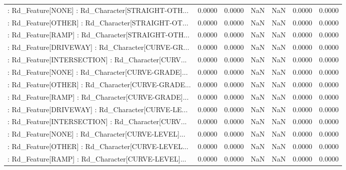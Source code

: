 \begin{longtable}{p{4cm}cccccc}
 : Rd\_Feature[NONE] : Rd\_Character[STRAIGHT-OTH... &            0.0000 &            0.0000 &     NaN &          NaN &             0.0000 &            0.0000 \\
 : Rd\_Feature[OTHER] : Rd\_Character[STRAIGHT-OT... &            0.0000 &            0.0000 &     NaN &          NaN &             0.0000 &            0.0000 \\
 : Rd\_Feature[RAMP] : Rd\_Character[STRAIGHT-OTH... &            0.0000 &            0.0000 &     NaN &          NaN &             0.0000 &            0.0000 \\
 : Rd\_Feature[DRIVEWAY] : Rd\_Character[CURVE-GR... &            0.0000 &            0.0000 &     NaN &          NaN &             0.0000 &            0.0000 \\
 : Rd\_Feature[INTERSECTION] : Rd\_Character[CURV... &            0.0000 &            0.0000 &     NaN &          NaN &             0.0000 &            0.0000 \\
 : Rd\_Feature[NONE] : Rd\_Character[CURVE-GRADE]... &            0.0000 &            0.0000 &     NaN &          NaN &             0.0000 &            0.0000 \\
 : Rd\_Feature[OTHER] : Rd\_Character[CURVE-GRADE... &            0.0000 &            0.0000 &     NaN &          NaN &             0.0000 &            0.0000 \\
 : Rd\_Feature[RAMP] : Rd\_Character[CURVE-GRADE]... &            0.0000 &            0.0000 &     NaN &          NaN &             0.0000 &            0.0000 \\
 : Rd\_Feature[DRIVEWAY] : Rd\_Character[CURVE-LE... &            0.0000 &            0.0000 &     NaN &          NaN &             0.0000 &            0.0000 \\
 : Rd\_Feature[INTERSECTION] : Rd\_Character[CURV... &            0.0000 &            0.0000 &     NaN &          NaN &             0.0000 &            0.0000 \\
 : Rd\_Feature[NONE] : Rd\_Character[CURVE-LEVEL]... &            0.0000 &            0.0000 &     NaN &          NaN &             0.0000 &            0.0000 \\
 : Rd\_Feature[OTHER] : Rd\_Character[CURVE-LEVEL... &            0.0000 &            0.0000 &     NaN &          NaN &             0.0000 &            0.0000 \\
 : Rd\_Feature[RAMP] : Rd\_Character[CURVE-LEVEL]... &            0.0000 &            0.0000 &     NaN &          NaN &             0.0000 &            0.0000 \\

\end{longtable}

